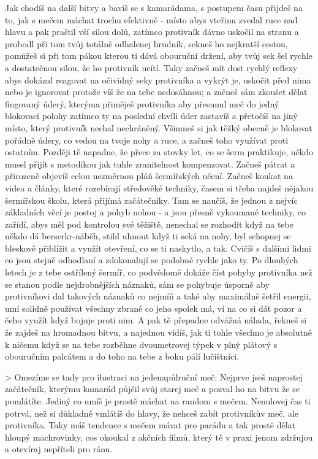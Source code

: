 Jak chodíš na další bitvy a bavíš se s kamarádama, s postupem času přijdeš na to, jak s mečem máchat trochu efektivně - místo abys vteřinu zvedal ruce nad hlavu a pak praštil vší silou dolů, zatímco protivník dávno uskočil na stranu a probodl při tom tvůj totálně odhalenej hrudník, sekneš ho nejkratší cestou, pomůžeš si při tom pákou kterou ti dává obouruční držení, aby tvůj sek šel rychle a dostatečnou silou, že ho protivník ucítí. Taky začneš mít dost rychlý reflexy abys dokázal reagovat na očividný seky protivníka a vykrýt je, uskočit před nima nebo je ignorovat protože víš že na tebe nedosáhnou; a začneš sám zkoušet dělat fingovaný úderý, kterýma přiměješ protivníka aby přesunul meč do jedný blokovací polohy zatímco ty na poslední chvíli úder zastavíš a přetočíš na jiný místo, který protivník nechal nechráněný. Všimneš si jak těžký obecně je blokovat pořádně údery, co vedou na tvoje nohy a ruce, a začneš toho využívat proti ostatním. Později tě napadne, že přece za stovky let, co se šerm praktikuje, někdo musel přijít s metodikou jak tuhle zranitelnost kompenzovat. Začneš pátrat a přirozeně objevíš celou nezměrnou pláň šermířských učení. Začneš koukat na videa a články, které rozebírají středověké techniky, časem si třeba najdeš nějakou šermířskou školu, která přijímá začátečníky. Tam se naučíš, že jednou z nejvíc základních věcí je postoj a pohyb nohou - a jsou přesně vykoumané techniky, co zařídí, abys měl pod kontrolou své těžiště, nenechal se rozhodit když na tebe někdo dá berserkr-náběh, stihl uhnout když ti seká na nohy, byl schopnej se bleskově přiblížit a využít otevření, co se ti naskytlo, a tak. Cvičíš s dalšími lidmi co jsou stejně odhodlaní a zdokonalují se podobně rychle jako ty. Po dlouhých letech je z tebe ostřílený šermíř, co podvědomě dokáže číst pohyby protivníka než se stanou podle nejdrobnějších náznaků, sám se pohybuje úsporně aby protivníkovi dal takových náznaků co nejmíň a také aby maximálně šetřil energii, umí solidně používat všechny zbraně co jeho spolek má, ví na co si dát pozor a čeho využít když bojuje proti nim. A pak tě přepadne odvážná nálada, řekneš si že zajdeš na hromadnou bitvu, a najednou vidíš, jak ti tohle všechno je absolutně k ničemu když se na tebe rozběhne dvoumetrovej týpek v plný plátový s obouručním palcátem a do toho na tebe z boku pálí lučištníci. 



> Omezíme se tady pro ilustraci na jedenapůlruční meč: Nejprve jseš naprostej začátečník, kterýmu kamarád půjčil svůj starej meč a pozval ho na bitvu že se pomlátíte. Jediný co umíš je prostě máchat na random s mečem. Nenulovej čas ti potrvá, než si důkladně vmlátíš do hlavy, že nehceš zabít protivníkův meč, ale protivníka. Taky máš tendence s mečem mávat pro parádu a tak prostě dělat hloupý machrovinky, cos okoukal z akčních filmů, který tě v praxi jenom zdržujou a otevíraj nepříteli pro ránu. 


